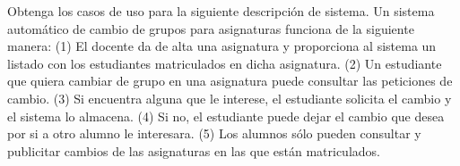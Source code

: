 Obtenga los casos de uso para la siguiente descripción de sistema. Un sistema automático de cambio de grupos para asignaturas funciona de la siguiente manera: (1) El docente da de alta una asignatura y proporciona al sistema un listado con los estudiantes matriculados en dicha asignatura. (2) Un estudiante que quiera cambiar de grupo en una asignatura puede consultar las peticiones de cambio. (3) Si encuentra alguna que le interese, el estudiante solicita el cambio y el sistema lo almacena. (4) Si no, el estudiante puede dejar el cambio que desea por si a otro alumno le interesara. (5) Los alumnos sólo pueden consultar y publicitar cambios de las asignaturas en las que están matriculados.
